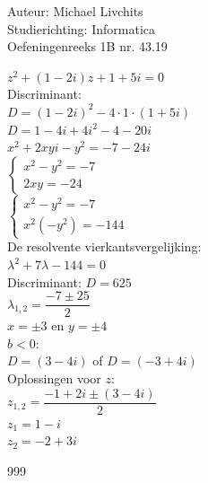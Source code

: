 \documentclass[a4paper]{article}
\begin{document}
  
\noindent \large Auteur: Michael Livchits \\
\noindent \large Studierichting: Informatica\\
\noindent \large Oefeningenreeks 1B nr. 43.19\\

\medskip

\normalsize

$z^2+(1-2i)z+1+5i=0$\\

Discriminant:\\

$D=(1-2i)^2-4\cdot1\cdot(1+5i)$\\

$D=1-4i+4i^2-4-20i$\\

$x^2+2xyi-y^2=-7-24i$\\

$\left\{
\begin{array}{l}
x^2-y^2=-7\\
2xy=-24
\end{array}
\right.$\\

$\left\{
\begin{array}{l}
x^2-y^2=-7\\
x^2(-y^2)=-144
\end{array}
\right.$\\

De resolvente vierkantsvergelijking:\\

$\lambda^2+7\lambda-144=0$\\

Discriminant: $D = 625$\\

$\lambda_{1,2}=\dfrac{-7\pm25}{2}$\\

$ x = \pm 3$ en $ y= \pm 4$ \\

$ b < 0 $:\\

$D = \left(3-4i\right) $ of $D = \left(-3+4i\right) $ \\

Oplossingen voor $z$:\\

$z_{1,2}=\dfrac{-1+2i\pm(3-4i)}{2}$\\

$z_1=1-i$\\

$z_2=-2+3i$\\


\begin{thebibliography}{999}
\end{thebibliography}
\end{document}
